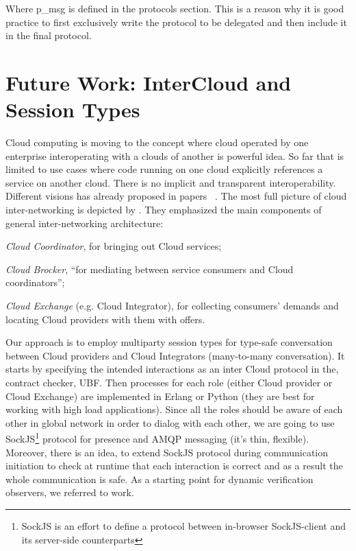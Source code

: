 \documentclass{llncs}
\begin{document}
Where p\_msg is defined in the protocols section. This is a reason why it is good practice to first exclusively write the protocol to be delegated and then include it in the final protocol.



\section{Future Work: InterCloud and Session Types}
\label{sect:highlights}
Cloud computing is moving to the concept where cloud operated by one enterprise interoperating with a clouds of another is powerful idea. So far that is limited to use cases where code running on one cloud explicitly references a service on another cloud. There is no implicit and transparent interoperability. 
Different visions has already proposed in papers ~\cite{utility-driven-fed,xmpp-intercloud-transport,cloud-integrator}. The most full picture of cloud inter-networking is depicted by \cite{utility-driven-fed}. They emphasized the main components of general inter-networking architecture:
\begin{inparaenum}
\item \textit{Cloud Coordinator}, for bringing out Cloud services;
\item \textit{Cloud Brocker}, ``for mediating between service consumers and Cloud coordinators'';
\item \textit{Cloud Exchange} (e.g. Cloud Integrator), for collecting consumers' demands and locating Cloud providers with them with offers.
\end{inparaenum}

Our approach is to employ multiparty session types \cite{ng2012multiparty} for type-safe conversation between Cloud providers and Cloud Integrators (many-to-many conversation). It starts by specifying the intended interactions as an inter Cloud protocol in the, contract checker, UBF. Then processes for each role (either Cloud provider or Cloud Exchange) are implemented in Erlang or Python (they are best for working with high load applications). Since all the roles should be aware of each other in global network in order to dialog with each other, we are going to use SockJS\footnote{SockJS is an effort to define a protocol between in-browser SockJS-client and its server-side counterparts} protocol for presence and AMQP messaging (it's thin, flexible). Moreover, there is an idea, to extend SockJS protocol during communication initiation to check at runtime that each interaction is correct and as a result the whole communication is safe. As a starting point for dynamic verification observers, we referred to \cite{safe-conver-prog-python} work.
\end{document}
